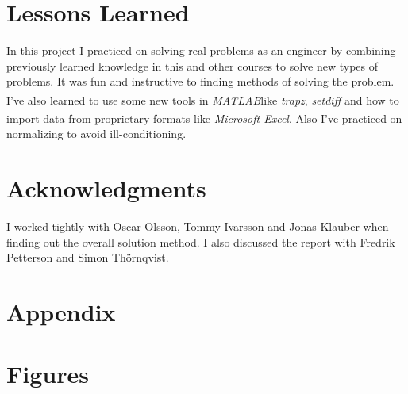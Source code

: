 \documentclass[10pt, a4paper]{article}
\newcommand{\matlab}{\small{\emph{MATLAB\textsuperscript{\textregistered}}}}
\newcommand{\excel}{\emph{Microsoft Excel\textsuperscript{\textregistered}}}
\begin{document}
\section{Lessons Learned}
In this project I practiced on solving real problems as an engineer by combining previously learned knowledge in this and other courses to solve new types of problems. It was fun and instructive to finding methods of solving the problem. I've also learned to use some new tools in \matlab like \emph{trapz}, \emph{setdiff} and how to import data from proprietary formats like \excel. Also I've practiced on normalizing to avoid ill-conditioning.

\section{Acknowledgments}

I worked tightly with Oscar Olsson, Tommy Ivarsson and Jonas Klauber when finding out the overall solution method. I also discussed the report with Fredrik Petterson and Simon Thörnqvist.

{}


\newpage
\section*{Appendix}
\appendix
\section{Figures} \label{appendix:figures}
\end{document}

